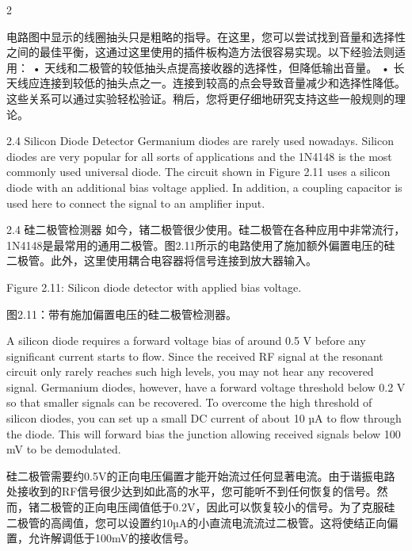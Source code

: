 \documentclass{ctexbook}
\begin{document}
\begin{paracol}{2}
\switchcolumn

电路图中显示的线圈抽头只是粗略的指导。在这里，您可以尝试找到音量和选择性之间的最佳平衡，这通过这里使用的插件板构造方法很容易实现。以下经验法则适用：
• 天线和二极管的较低抽头点提高接收器的选择性，但降低输出音量。
• 长天线应连接到较低的抽头点之一。连接到较高的点会导致音量减少和选择性降低。
这些关系可以通过实验轻松验证。稍后，您将更仔细地研究支持这些一般规则的理论。

\switchcolumn*

2.4 Silicon Diode Detector 
Germanium diodes are rarely used nowadays. Silicon diodes are very popular for all sorts of 
applications and the 1N4148 is the most commonly used universal diode. The circuit shown 
in Figure 2.11 uses a silicon diode with an additional bias voltage applied. In addition, a 
coupling capacitor is used here to connect the signal to an amplifier input. 

\switchcolumn

2.4 硅二极管检测器
如今，锗二极管很少使用。硅二极管在各种应用中非常流行，1N4148是最常用的通用二极管。图2.11所示的电路使用了施加额外偏置电压的硅二极管。此外，这里使用耦合电容器将信号连接到放大器输入。

\switchcolumn*

Figure 2.11: Silicon diode detector with applied bias voltage. 

\switchcolumn

图2.11：带有施加偏置电压的硅二极管检测器。

\switchcolumn*

A silicon diode requires a forward voltage bias of around 0.5 V before any significant current 
starts to flow. Since the received RF signal at the resonant circuit only rarely reaches such 
high levels, you may not hear any recovered signal. Germanium diodes, however, have a 
forward voltage threshold below 0.2 V so that smaller signals can be recovered. To overcome the high threshold of silicon diodes, you can set up a small DC current of about 10 µA 
to flow through the diode. This will forward bias the junction allowing received signals below 
100 mV to be demodulated. 

\switchcolumn

硅二极管需要约0.5V的正向电压偏置才能开始流过任何显著电流。由于谐振电路处接收到的RF信号很少达到如此高的水平，您可能听不到任何恢复的信号。然而，锗二极管的正向电压阈值低于0.2V，因此可以恢复较小的信号。为了克服硅二极管的高阈值，您可以设置约10µA的小直流电流流过二极管。这将使结正向偏置，允许解调低于100mV的接收信号。


\end{paracol}
\end{document}
